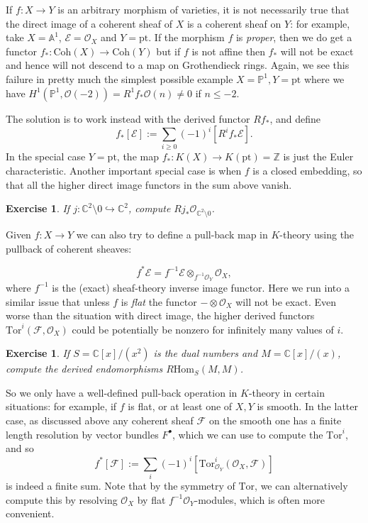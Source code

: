 \documentclass[11pt]{amsart}
\newtheorem{exercise}[dummy]{Exercise}
\theoremstyle{definition}
\newcommand{\bC}{\mathbb{C}}
\newcommand{\bP}{\mathbb{P}}
\newcommand{\Ec}{\mathcal{E}}
\newcommand{\Fc}{\mathcal{F}}
\newcommand{\Oc}{\mathcal{O}}
\newcommand{\Hom}{\mathrm{Hom}}
\newcommand{\Tor}{\mathrm{Tor}}
\newcommand{\Coh}{\mathrm{Coh}}
\numberwithin{equation}{subsection}
\numberwithin{figure}{subsection}
\newcommand{\pt}{\mathrm{pt}}
\begin{document}
If $f:X\rightarrow Y$ is an arbitrary morphism of varieties, it is not necessarily true that the direct image of a coherent sheaf of $X$ is a coherent sheaf on $Y$: for example, take $X=\mathbb{A}^1$, $\mathcal{E}=\mathcal{O}_X$ and $Y=\pt$. If the morphism $f$ is \emph{proper}, then we do get a functor $f_*:\Coh(X)\rightarrow \Coh(Y)$ but if $f$ is not affine then $f_*$ will not be exact and hence will not descend to a map on Grothendieck rings. Again, we see this failure in pretty much the simplest possible example $X=\mathbb{P}^1, Y=\pt$ where we have $H^1(\bP^1,\Oc(-2)) = R^1f_*\Oc(n)\neq0$ if $n\leq-2$.

The solution is to work instead with the derived functor $Rf_*$,  and define
$$
f_*[\Ec] := \sum_{i\geq0} (-1)^i[R^if_*\Ec].
$$
In the special case $Y=\pt$, the map $f_*:K(X)\rightarrow K(\pt)=\mathbb{Z}$ is just the Euler characteristic. Another important special case is when $f$ is a closed embedding, so that all the higher direct image functors in the sum above vanish.

\begin{exercise}
If $j:\mathbb{C}^2\setminus 0\hookrightarrow \mathbb{C}^2$, compute $Rj_*\mathcal{O}_{\mathbb{C}^2\setminus 0}$.
\end{exercise}
Given $f:X\rightarrow Y$ we can also try to define a pull-back map in $K$-theory using the pullback of coherent sheaves:

$$
f^*\Ec = f^{-1}\Ec\otimes_{f^{-1}\Oc_Y}\Oc_X,
$$
where $f^{-1}$ is the (exact) sheaf-theory inverse image functor. Here we run into a similar issue that unless $f$ is \emph{flat} the functor $- \otimes \Oc_X$ will not be exact. Even worse than the situation with direct image, the higher derived functors $\Tor^i(\Fc,\Oc_X)$ could be potentially be nonzero for infinitely many values of $i$. 
\begin{exercise}
If $S=\bC[x]/(x^2)$ is the dual numbers and $M=\bC[x]/(x)$, compute the derived endomorphisms $R\Hom_S(M,M)$.
\end{exercise}
So we only have a well-defined pull-back operation in $K$-theory in certain situations: for example, if $f$ is flat, or at least one of $X,Y$ is smooth. In the latter case, as discussed above any coherent sheaf $\Fc$ on the smooth one has a finite length resolution by vector bundles $F^\bullet$, which we can use to compute the $\Tor^i$, and so
$$
f^*[\mathcal{F}] := \sum_i(-1)^i[\Tor_{\Oc_Y}^i(\Oc_X,\Fc)]
$$
is indeed a finite sum. Note that by the symmetry of $\Tor$, we can alternatively compute this by resolving $\Oc_X$ by flat $f^{-1}\Oc_Y$-modules, which is often more convenient. 
\end{document}
